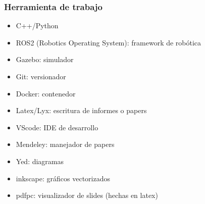 \begin{frame}
    \frametitle{Herramienta de trabajo}

    \begin{itemize}
        \item C++/Python
        \item ROS2 (Robotics Operating System): framework de robótica
        \item Gazebo: simulador
        \item Git: versionador
        \item Docker: contenedor
        \item Latex/Lyx: escritura de informes o papers
        \item VScode: IDE de desarrollo
        \item Mendeley: manejador de papers
        \item Yed: diagramas
        \item inkscape: gráficos vectorizados
        \item pdfpc: visualizador de slides (hechas en latex)
    \end{itemize}
\end{frame}